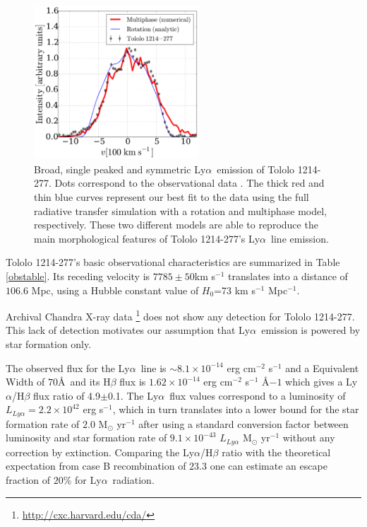 \documentclass[a4,useAMS,usenatbib,usegraphicx]{mn2e}
\newcommand{\tol}{Tololo 1214-277}
\newcommand{\lya}{Ly$\alpha$}
\begin{document}
\begin{figure}
\begin{center}
\includegraphics[width=0.55\textwidth]{CLARA-TOL-main.pdf}
\caption{Broad, single peaked and symmetric \lya\ emission of \tol.
  Dots correspond to the observational data \citep{mashesse03}. 
The thick red and thin blue curves represent our best fit
to the data using the full radiative transfer simulation with a
rotation and multiphase model, respectively. 
These two different models are able to reproduce the main morphological
features of \tol's \lya\ line emission.\label{fig:results}}
\end{center}
\end{figure}

\tol's basic observational characteristics are summarized in Table \ref{obstable}.
Its receding velocity is $7785\pm 50$km s$^{-1}$ translates
into a distance of $106.6$ Mpc, using a Hubble constant value of $H_{0}$=73
km s$^{-1}$ Mpc$^{-1}$.

Archival Chandra X-ray data \footnote{\url{http://cxc.harvard.edu/cda/}} does not show any
detection for \tol. 
This lack of detection motivates our assumption that \lya\ emission is
powered by star formation only.

The observed flux for the \lya\ line is $\sim
8.1\times 10^{-14}$ erg cm$^{-2}$ s$^{-1}$ \citep{Thuan97}
and a Equivalent Width of $70$\AA\ and its H$\beta$ flux is 
$1.62\times 10^{-14}$ erg cm$^{-2}$ s$^{-1}$ \AA${-1}$
\citep{Izotov04} which gives a \lya/H$\beta$ flux ratio of
4.9$\pm$0.1.
The \lya\ flux values correspond to a luminosity of
$L_{Ly\alpha}=2.2\times 10^{42}$ erg s$^{-1}$, which in turn
translates  into a lower bound for the star formation rate of $2.0$
M$_{\odot}$ yr$^{-1}$ after using a standard conversion factor between
luminosity and star formation rate of $9.1\times 10^{-43}$
$L_{Ly\alpha}$ M$_{\odot}$ yr$^{-1}$ \citep{Kennicutt98} without any
correction by extinction.  
Comparing the \lya/H$\beta$ ratio with the theoretical
expectation from case B recombination of $23.3$ \citep{Hummer1987} one
can estimate an escape fraction of $20$\% for \lya\ radiation.
\end{document}
